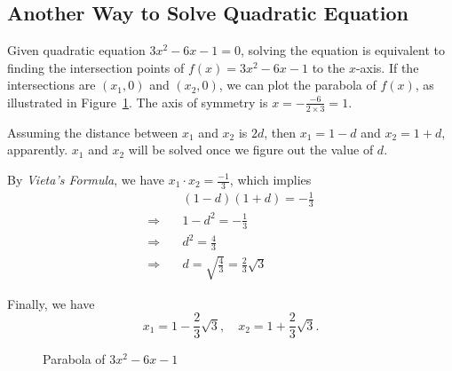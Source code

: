 \documentclass[11pt, oneside]{article}   	%
\begin{document}
\subsection{Another Way to Solve Quadratic Equation}
Given quadratic equation  $3x^2-6x-1=0$, solving the equation is equivalent to finding the intersection points of $f(x) =3x^2 -6x -1$ to the $x$-axis. If the intersections are $(x_1, 0)$ and $(x_2, 0)$, we can plot the parabola  of $f(x)$, as illustrated in Figure~\ref{fig:parabola}. The axis of symmetry is $x = -\frac{-6}{2\times 3} = 1$. 

Assuming the distance between $x_1$ and $x_2$ is $2d$, then $x_1 = 1-d$ and $x_2 = 1+d$, apparently. $x_1$ and $x_2$ will be solved once we figure out the value of $d$. 

By \emph{Vieta's Formula}, we have $x_1\cdot x_2 = \frac{-1}{3}$, which implies 
\begin{align*}
&(1-d)(1+d) = -\frac{1}{3}\\
\Rightarrow \quad & 1-d^2 = -\frac{1}{3}\\
\Rightarrow \quad & d^2 = \frac{4}{3}\\
\Rightarrow \quad & d= \sqrt{\frac{4}{3}} = \frac{2}{3}\sqrt{3}
\end{align*}

Finally, we have
\[x_1= 1-\frac{2}{3}\sqrt{3}, \quad x_2 = 1+\frac{2}{3}\sqrt{3}.\]

\begin{figure}
\centering 
{}
\caption{Parabola of $3x^2 - 6x -1$}
\label{fig:parabola}
\end{figure}
\end{document}
